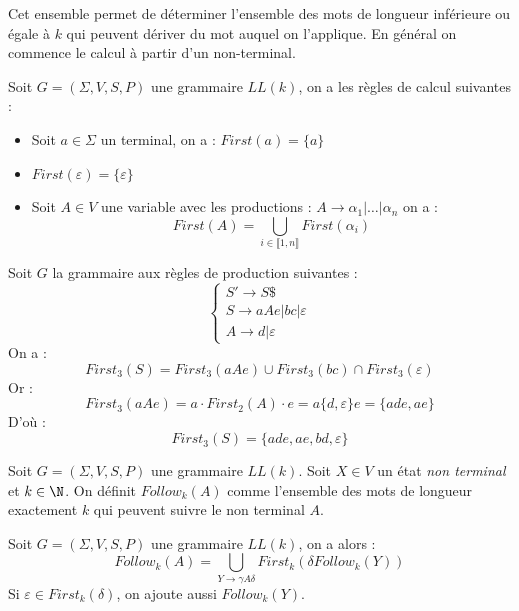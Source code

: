 Cet ensemble permet de déterminer l'ensemble des mots de longueur inférieure ou égale à $k$ qui peuvent 
dériver du mot auquel on l'applique. En général on commence le calcul à partir d'un non-terminal.

\begin{prop}
    Soit $G = ( \Sigma, V, S, P)$ une grammaire $LL(k)$, on a les règles de calcul suivantes : 
    \begin{itemize}
        \item Soit $a \in \Sigma$ un terminal, on a : $ First(a) = \{a\}$ 
        \item $First( \varepsilon) = \{ \varepsilon\}$ 
        \item Soit $A \in V$ une variable avec les productions : $A \rightarrow \alpha_1 | \dots | \alpha_n$ on a :
            \[ First(A) = \bigcup_{i \in \llbracket 1, n \rrbracket} First( \alpha_i) \] 
    \end{itemize}
\end{prop}

\begin{example}
    Soit $G$ la grammaire aux règles de production suivantes : 
        $$ 
            \begin{cases}
                S' \to S \$ \\ 
                S \to aAe | bc | \varepsilon \\ 
                A \to d | \varepsilon 
            \end{cases}
        $$
    On a :
        $$ First_3(S) = First_3(aAe) \cup First_3(bc) \cap First_3( \varepsilon) $$ 
    Or : 
        $$ First_3(aAe) = a \cdot First_2(A) \cdot e = a \{d, \varepsilon\} e = \{ade, ae\} $$ 
    D'où : 
        $$ First_3(S) = \{ade, ae, bd, \varepsilon\} $$
\end{example}

\begin{definition}
    Soit $G = ( \Sigma, V, S, P)$ une grammaire $LL(k)$. 
    Soit $X \in V$ un état \emph{non terminal} et $k \in \N$. On définit $Follow_k(A)$ comme l'ensemble 
    des mots de longueur exactement $k$ qui peuvent suivre le non terminal $A$. 
\end{definition}

\begin{prop}
    Soit $G = ( \Sigma, V, S, P)$ une grammaire $LL(k)$, on a alors : 
        $$ Follow_k(A) = \bigcup_{Y \to \gamma A \delta} First_k( \delta Follow_k(Y)) $$
    Si $\varepsilon \in First_k(\delta)$, on ajoute aussi $Follow_k(Y)$.
\end{prop}

